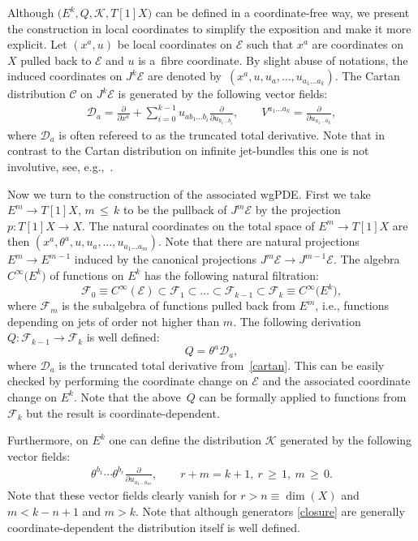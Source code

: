 \documentclass[pdftex]{sigma}
\numberwithin{equation}{section}
\theoremstyle{definition}
\newcommand{\changed}[1]{{#1}}
\newcommand{\cF}{\mathcal{F}}
\renewcommand{\geq}{\,{\geqslant}\,}
\renewcommand{\leq}{\,{\leqslant}\,}
\def\cD{\mathcal{D}}
\def\cE{\mathcal{E}}
\def\cK{\mathcal{K}}
\begin{document}
Although $\bigl(E^k,Q,\cK,T[1]X\bigr)$ can be defined in a coordinate-free way, we present the construction in local coordinates to simplify the exposition and make it more explicit. Let $(x^a,u)$ be local coordinates on $\cE$ such that $x^a$ are coordinates on $X$ pulled back to $\cE$ and $u$ is a~fibre coordinate. By slight abuse of notations, the induced coordinates on $J^k\mathcal{E}$ are denoted by~$(x^a,u,u_a,\dots,u_{a_1\dots a_k})$. The Cartan distribution $\mathcal{C}$ on $J^k\mathcal{E}$ is generated by the following vector fields:
\begin{gather}\label{cartan}
 \mathcal{D}_a=\frac{\partial}{\partial x^a}+\sum^{k-1}_{i=0}u_{a b_1\dots b_i}\frac{\partial}{\partial u_{b_1\dots b_{i}}}, \qquad V^{a_1\dots a_k}=\frac{\partial}{\partial u_{a_1\dots a_k}},
\end{gather}
where $\mathcal{D}_a$ is often refereed to as the truncated total derivative. Note that in contrast to the Cartan distribution on infinite jet-bundles this one is not involutive, see, e.g.,~\cite{Bocharov:1999}.


Now we turn to the construction of the associated wgPDE. First we take $E^m \to T[1]X$, $m\leq k$ to be the pullback of $J^m\mathcal{E}$ by the projection $p\colon T[1]X\rightarrow X$. \changed{The natural coordinates on the total space of $E^m\to T[1]X$} are then $(x^a,\theta^a,u,u_a,\dots,u_{a_1\dots a_m})$. Note that there are natural projections $E^{m}\to E^{m-1}$ induced by the canonical projections $J^m\cE\to J^{m-1}\cE $. The algebra $C^{\infty}\bigl(E^k\bigr)$ of functions on $E^k$ has the following natural filtration:
\begin{equation*}
\cF_0\equiv C^{\infty}(\cE) \subset \cF_1\subset \dots \subset \cF_{k-1}\subset \cF_k\equiv C^{\infty}\bigl(E^k\bigr),
\end{equation*}
where $\cF_m$ is the subalgebra of functions pulled back from $E^m$, i.e., functions depending on jets of order not higher than $m$. The following derivation $Q\colon \cF_{k-1}\to \cF_{k}$ is well defined:
\begin{equation*}
Q=\theta^a \cD_a,
\end{equation*}
where $\cD_a$ is the truncated total derivative from~\eqref{cartan}. This can be easily checked by performing the coordinate change on $\cE$ and the associated coordinate change on $E^k$. Note that the above~$Q$ can be formally applied to functions from $\cF_{k}$ but the result is coordinate-dependent.

Furthermore, on $E^k$ one can define the distribution $\cK$ generated by the following vector fields:
\begin{gather}\label{closure}
 \theta^{b_1}\cdots\theta^{b_r}\frac{\partial}{\partial u_{a_1\dots a_m}}, \qquad r+m=k+1, \ r\geq 1 ,\ m\geq 0.
\end{gather}
Note that these vector fields clearly vanish for $r>n\equiv \dim(X)$ and $m<k-n+1$ and $m>k$. Note that although generators \eqref{closure} are generally coordinate-dependent the distribution itself is well defined.
\end{document}
